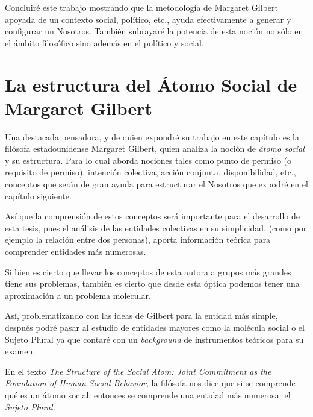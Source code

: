 \documentclass[oneside]{book}
\begin{document}
Concluiré este trabajo mostrando que la metodología de Margaret Gilbert apoyada de un contexto social, político, etc., ayuda efectivamente a generar y configurar un Nosotros. También subrayaré la potencia de esta noción no sólo en el ámbito filosófico sino además en el político y social. 

\chapter{La estructura del Átomo Social de Margaret Gilbert}

Una destacada pensadora, y de quien expondré su trabajo en este capítulo es la filósofa estadounidense Margaret Gilbert, quien analiza la noción de \textit{átomo social} y su estructura. Para lo cual aborda nociones tales como punto de permiso (o requisito de permiso), intención colectiva, acción conjunta, disponibilidad, etc., conceptos que serán de gran ayuda para estructurar el Nosotros que expodré en el capítulo siguiente. 

Así que la comprensión de estos conceptos será importante para el desarrollo de esta tesis, pues el análisis de las entidades colectivas en su simplicidad, (como por ejemplo la relación entre dos personas), aporta información teórica para comprender entidades más numerosas. 

Si bien es cierto que llevar los conceptos de esta autora a grupos más grandes tiene sus problemas, también es cierto que desde esta óptica podemos tener una aproximación a un problema molecular.

Así, problematizando con las ideas de Gilbert para la entidad más simple, después podré pasar al estudio de entidades mayores como la molécula social o el Sujeto Plural ya que contaré con un \textit{background} de instrumentos teóricos para su examen.

En el texto \textit{The Structure of the Social Atom: Joint Commitment as the Foundation of Human Social Behavior}\cite{gilbert_1}, la filósofa nos dice que si se comprende qué es un átomo social, entonces se comprende una entidad más numerosa: el \textit{Sujeto Plural.}
\end{document}
